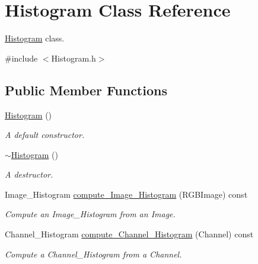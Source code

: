\hypertarget{class_histogram}{}\section{Histogram Class Reference}
\label{class_histogram}


\hyperlink{class_histogram}{Histogram} class.  




{\ttfamily \#include $<$Histogram.\+h$>$}

\subsection*{Public Member Functions}
\begin{DoxyCompactItemize}
\item 
\mbox{\label{class_histogram_af681f293852ac145f867ecfcce3062a5}} 
\hyperlink{class_histogram_af681f293852ac145f867ecfcce3062a5}{Histogram} ()
\begin{DoxyCompactList}\small\item\em A default constructor. \end{DoxyCompactList}\item 
\mbox{\label{class_histogram_aaf22daf3b8e3f0578337109005532f51}} 
\hyperlink{class_histogram_aaf22daf3b8e3f0578337109005532f51}{$\sim$\+Histogram} ()
\begin{DoxyCompactList}\small\item\em A destructor. \end{DoxyCompactList}\item 
Image\+\_\+\+Histogram \hyperlink{class_histogram_aa1c0308f30b7dcdc5305ece5bc39a0ba}{compute\+\_\+\+Image\+\_\+\+Histogram} (R\+G\+B\+Image) const
\begin{DoxyCompactList}\small\item\em Compute an Image\+\_\+\+Histogram from an Image. \end{DoxyCompactList}\item 
Channel\+\_\+\+Histogram \hyperlink{class_histogram_aa842a6d1281967505d3be94ac5eec727}{compute\+\_\+\+Channel\+\_\+\+Histogram} (Channel) const
\begin{DoxyCompactList}\small\item\em Compute a Channel\+\_\+\+Histogram from a Channel. \end{DoxyCompactList}\end{DoxyCompactItemize}


